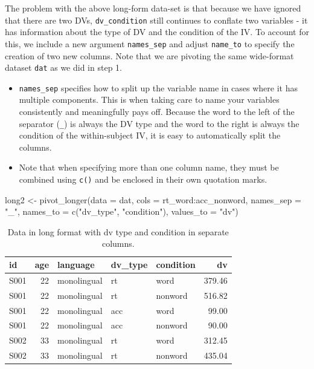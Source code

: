 \documentclass[
  english,
  doc,floatsintext]{apa6}
\newenvironment{Shaded}{\begin{snugshade}}{\end{snugshade}}
\newcommand{\AttributeTok}[1]{\textcolor[rgb]{0.77,0.63,0.00}{#1}}
\newcommand{\FunctionTok}[1]{\textcolor[rgb]{0.00,0.00,0.00}{#1}}
\newcommand{\NormalTok}[1]{#1}
\newcommand{\OtherTok}[1]{\textcolor[rgb]{0.56,0.35,0.01}{#1}}
\newcommand{\SpecialCharTok}[1]{\textcolor[rgb]{0.00,0.00,0.00}{#1}}
\newcommand{\StringTok}[1]{\textcolor[rgb]{0.31,0.60,0.02}{#1}}
\begin{document}
The problem with the above long-form data-set is that because we have ignored that there are two DVs, \texttt{dv\_condition} still continues to conflate two variables - it has information about the type of DV and the condition of the IV. To account for this, we include a new argument \texttt{names\_sep} and adjust \texttt{name\_to} to specify the creation of two new columns. Note that we are pivoting the same wide-format dataset \texttt{dat} as we did in step 1.

\begin{itemize}
\item
  \texttt{names\_sep} specifies how to split up the variable name in cases where it has multiple components. This is when taking care to name your variables consistently and meaningfully pays off. Because the word to the left of the separator (\texttt{\_}) is always the DV type and the word to the right is always the condition of the within-subject IV, it is easy to automatically split the columns.
\item
  Note that when specifying more than one column name, they must be combined using \texttt{c()} and be enclosed in their own quotation marks.
\end{itemize}

\begin{Shaded}
\begin{Highlighting}[]
\NormalTok{long2 }\OtherTok{\textless{}{-}} \FunctionTok{pivot\_longer}\NormalTok{(}\AttributeTok{data =}\NormalTok{ dat, }
                     \AttributeTok{cols =}\NormalTok{ rt\_word}\SpecialCharTok{:}\NormalTok{acc\_nonword, }
                     \AttributeTok{names\_sep =} \StringTok{"\_"}\NormalTok{, }
                     \AttributeTok{names\_to =} \FunctionTok{c}\NormalTok{(}\StringTok{"dv\_type"}\NormalTok{, }\StringTok{"condition"}\NormalTok{),}
                     \AttributeTok{values\_to =} \StringTok{"dv"}\NormalTok{)}
\end{Highlighting}
\end{Shaded}

\begin{table}

\caption{\label{tab:long-example}Data in long format with dv type and condition in separate columns.}
\centering
\begin{tabular}[t]{l|r|l|l|l|r}
\hline
id & age & language & dv\_type & condition & dv\\
\hline
S001 & 22 & monolingual & rt & word & 379.46\\
\hline
S001 & 22 & monolingual & rt & nonword & 516.82\\
\hline
S001 & 22 & monolingual & acc & word & 99.00\\
\hline
S001 & 22 & monolingual & acc & nonword & 90.00\\
\hline
S002 & 33 & monolingual & rt & word & 312.45\\
\hline
S002 & 33 & monolingual & rt & nonword & 435.04\\
\hline
\end{tabular}
\end{table}
\end{document}
